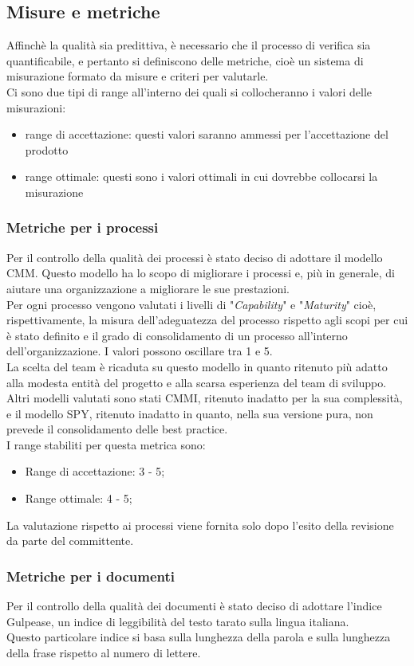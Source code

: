 		\subsection{Misure e metriche}
		Affinchè la qualità sia predittiva, è necessario che il processo di verifica sia quantificabile, e pertanto si definiscono delle metriche, cioè un sistema di misurazione formato da misure e criteri per valutarle.\\
		Ci sono due tipi di range all'interno dei quali si collocheranno i valori delle misurazioni:
		\begin{itemize}
			\item range di accettazione: questi valori saranno ammessi per l'accettazione del prodotto
			\item range ottimale: questi sono i valori ottimali in cui dovrebbe collocarsi la misurazione
		\end{itemize}
		\subsubsection{Metriche per i processi}
			Per il controllo della qualità dei processi è stato deciso di adottare il modello CMM. Questo modello ha lo scopo di migliorare i processi e, più in generale, di aiutare una organizzazione a migliorare le sue prestazioni.\\
			Per ogni processo vengono valutati i livelli di "\textit{Capability}" e "\textit{Maturity}" cioè, rispettivamente, la misura dell'adeguatezza del processo  rispetto agli scopi per cui è stato definito e il grado di consolidamento di un processo all'interno dell'organizzazione. I valori possono oscillare tra 1 e 5.\\
			La scelta del team è ricaduta su questo modello in quanto ritenuto più adatto alla modesta entità del progetto e alla scarsa esperienza del team di sviluppo. Altri modelli valutati sono stati CMMI, ritenuto inadatto per la sua complessità, e il modello SPY, ritenuto inadatto in quanto, nella sua versione pura, non prevede il consolidamento delle best practice.\\
			I range stabiliti per questa metrica sono:
			\begin{itemize}
				\item Range di accettazione: 3 - 5;
				\item Range ottimale: 4 - 5;
			\end{itemize}	
			La valutazione rispetto ai processi viene fornita solo dopo l'esito della revisione da parte del committente.
		\subsubsection{Metriche per i documenti}
			Per il controllo della qualità dei documenti è stato deciso di adottare l'indice Gulpease, un indice di leggibilità del testo tarato sulla lingua italiana.\\
			Questo particolare indice si basa sulla lunghezza della parola e sulla lunghezza della frase rispetto al numero di lettere.\\
			
